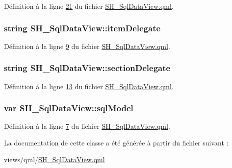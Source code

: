 Définition à la ligne \hyperlink{SH__SqlDataView_8qml_source_l00021}{21} du fichier \hyperlink{SH__SqlDataView_8qml_source}{S\-H\-\_\-\-Sql\-Data\-View.\-qml}.

\hypertarget{classSH__SqlDataView_a7ae6767ae8a82bd33b942c774c534a33}{
\subsubsection[{item\-Delegate}]{\setlength{\rightskip}{0pt plus 5cm}string S\-H\-\_\-\-Sql\-Data\-View\-::item\-Delegate}}\label{classSH__SqlDataView_a7ae6767ae8a82bd33b942c774c534a33}


Définition à la ligne \hyperlink{SH__SqlDataView_8qml_source_l00009}{9} du fichier \hyperlink{SH__SqlDataView_8qml_source}{S\-H\-\_\-\-Sql\-Data\-View.\-qml}.

\hypertarget{classSH__SqlDataView_a60486947b034f5fca72a2d5775ad1767}{
\subsubsection[{section\-Delegate}]{\setlength{\rightskip}{0pt plus 5cm}string S\-H\-\_\-\-Sql\-Data\-View\-::section\-Delegate}}\label{classSH__SqlDataView_a60486947b034f5fca72a2d5775ad1767}


Définition à la ligne \hyperlink{SH__SqlDataView_8qml_source_l00013}{13} du fichier \hyperlink{SH__SqlDataView_8qml_source}{S\-H\-\_\-\-Sql\-Data\-View.\-qml}.

\hypertarget{classSH__SqlDataView_ad538d6f1dd43a7d01c7960a74ca131dc}{
\subsubsection[{sql\-Model}]{\setlength{\rightskip}{0pt plus 5cm}var S\-H\-\_\-\-Sql\-Data\-View\-::sql\-Model}}\label{classSH__SqlDataView_ad538d6f1dd43a7d01c7960a74ca131dc}


Définition à la ligne \hyperlink{SH__SqlDataView_8qml_source_l00007}{7} du fichier \hyperlink{SH__SqlDataView_8qml_source}{S\-H\-\_\-\-Sql\-Data\-View.\-qml}.



La documentation de cette classe a été générée à partir du fichier suivant \-:\begin{DoxyCompactItemize}
\item 
views/qml/\hyperlink{SH__SqlDataView_8qml}{S\-H\-\_\-\-Sql\-Data\-View.\-qml}\end{DoxyCompactItemize}
